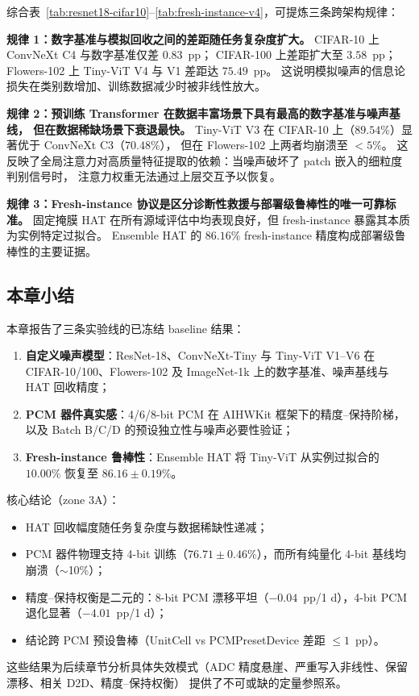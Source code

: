 综合表~\ref{tab:resnet18-cifar10}--\ref{tab:fresh-instance-v4}，可提炼三条跨架构规律：

\textbf{规律 1：数字基准与模拟回收之间的差距随任务复杂度扩大。}
CIFAR-10 上 ConvNeXt C4 与数字基准仅差 $0.83$~pp；
CIFAR-100 上差距扩大至 $3.58$~pp；
Flowers-102 上 Tiny-ViT V4 与 V1 差距达 $75.49$~pp。
这说明模拟噪声的信息论损失在类别数增加、训练数据减少时被非线性放大。

\textbf{规律 2：预训练 Transformer 在数据丰富场景下具有最高的数字基准与噪声基线，
但在数据稀缺场景下衰退最快。}
Tiny-ViT V3 在 CIFAR-10 上（$89.54\%$）显著优于 ConvNeXt C3（$70.48\%$），
但在 Flowers-102 上两者均崩溃至 $<5\%$。
这反映了全局注意力对高质量特征提取的依赖：当噪声破坏了 patch 嵌入的细粒度判别信号时，
注意力权重无法通过上层交互予以恢复。

\textbf{规律 3：Fresh-instance 协议是区分诊断性救援与部署级鲁棒性的唯一可靠标准。}
固定掩膜 HAT 在所有源域评估中均表现良好，但 fresh-instance 暴露其本质为实例特定过拟合。
Ensemble HAT 的 $86.16\%$ fresh-instance 精度构成部署级鲁棒性的主要证据。

\subsection{本章小结}

本章报告了三条实验线的已冻结 baseline 结果：
\begin{enumerate}
    \item \textbf{自定义噪声模型}：ResNet-18、ConvNeXt-Tiny 与 Tiny-ViT V1--V6 在 CIFAR-10/100、Flowers-102 及 ImageNet-1k 上的数字基准、噪声基线与 HAT 回收精度；
    \item \textbf{PCM 器件真实感}：4/6/8-bit PCM 在 AIHWKit 框架下的精度--保持阶梯，
    以及 Batch B/C/D 的预设独立性与噪声必要性验证；
    \item \textbf{Fresh-instance 鲁棒性}：Ensemble HAT 将 Tiny-ViT 从实例过拟合的 $10.00\%$ 恢复至 $86.16\pm0.19\%$。
\end{enumerate}

核心结论（zone 3A）：
\begin{itemize}
    \item HAT 回收幅度随任务复杂度与数据稀缺性递减；
    \item PCM 器件物理支持 4-bit 训练（$76.71\pm0.46\%$），而所有纯量化 4-bit 基线均崩溃（$\sim$10\%）；
    \item 精度--保持权衡是二元的：8-bit PCM 漂移平坦（$-0.04$~pp/1 d），4-bit PCM 退化显著（$-4.01$~pp/1 d）；
    \item 结论跨 PCM 预设鲁棒（UnitCell vs PCMPresetDevice 差距 $\leqslant1$~pp）。
\end{itemize}

这些结果为后续章节分析具体失效模式（ADC 精度悬崖、严重写入非线性、保留漂移、相关 D2D、精度--保持权衡）
提供了不可或缺的定量参照系。
